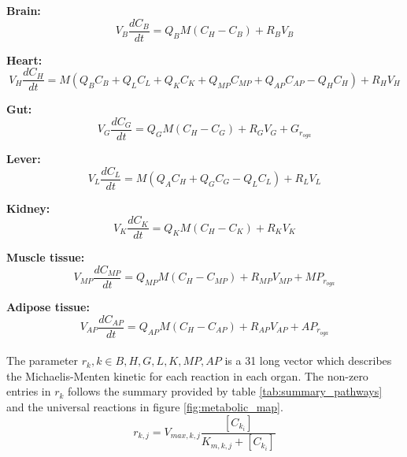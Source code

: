 \documentclass{IEEEtran}
\begin{document}
\textbf{Brain:}
\begin{equation}
    V_{B}  \frac{dC_{B}}{dt} = Q_{B} M (C_H - C_B) + R_B V_B
\end{equation}

\textbf{Heart:}
\begin{equation}
    V_{H}  \frac{dC_{H}}{dt} = M (Q_{B}  C_B + Q_{L} C_L + Q_{K} C_K  + Q_{MP} C_{MP} + Q_{AP} C_{AP} - Q_{H} C_H)   + R_H V_H
\end{equation}

\textbf{Gut:}
\begin{equation}
    V_{G}  \frac{dC_{G}}{dt} = Q_{G} M (C_H - C_G) + R_G V_G + G_{r_{oga}}
\end{equation}

\textbf{Lever:}
\begin{equation}
    V_{L}  \frac{dC_{L}}{dt} = M (Q_{A} C_H + Q_{G} C_G - Q_{L} C_L) + R_L V_L
\end{equation}

\textbf{Kidney:}
\begin{equation}
    V_{K}  \frac{dC_{K}}{dt} = Q_{K} M (C_H - C_K) + R_K V_K
\end{equation}

\textbf{Muscle tissue:}
\begin{equation}
    V_{MP}  \frac{dC_{MP}}{dt} = Q_{MP} M (C_H - C_{MP}) + R_{ MP}V_{MP} + MP_{r_{oga}} 
\end{equation}

\textbf{Adipose tissue:}
\begin{equation}
    V_{AP}  \frac{dC_{AP}}{dt} = Q_{AP} M (C_H - C_{AP}) + R_{ AP}V_{AP} + AP_{r_{oga}} 
\end{equation} \\


The parameter $r_k , k \in {B,H,G,L,K,MP,AP}$ is a 31 long vector which describes the Michaelis-Menten kinetic for each reaction in each organ. The non-zero entries in $r_k$ follows the summary provided by table \ref{tab:summary_pathways} and the universal reactions in figure \ref{fig:metabolic_map}. \\

\begin{equation}
    r_{k,j} = V_{max,k,j} \frac{[C_{k_i}]}{K_{m,k,j}+[C_{k_i}]} 
\end{equation}
\end{document}
